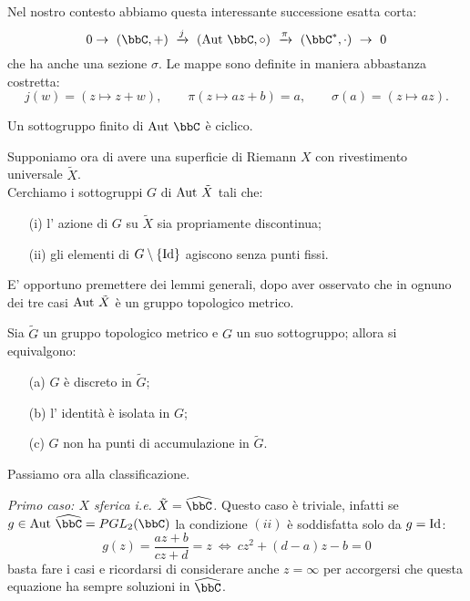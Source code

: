 Nel nostro contesto abbiamo questa interessante successione esatta corta:
$$
0\rightarrow\ (\bbC,+)\ \xrightarrow{j}\ (\Aut{\bbC},\circ)\ \xrightarrow{\pi}\ (\bbC^*,\cdot)\  \rightarrow\ 0
$$
che ha anche una sezione $\sigma$. Le mappe sono definite in maniera abbastanza costretta:
$$
j(w)=(z\mapsto z+w),\qquad \pi(z\mapsto az+b)=a,\qquad \sigma(a)=(z\mapsto az).
$$
\begin{esercizio}
Un sottogruppo finito di $\Aut{\bbC}$ è ciclico.
\end{esercizio}
Supponiamo ora di avere una superficie di Riemann $X$ con rivestimento universale $\tilde X$.\\
Cerchiamo i sottogruppi $G$ di $\text{Aut }{\tilde{X}}$ tali che:
\begin{itemize}
\item[(i)] l' azione di $G$ su $\tilde{X}$ sia propriamente discontinua;
\item[(ii)] gli elementi di $G\setminus\{\text{Id}\}$ agiscono senza punti fissi.
\end{itemize}
E' opportuno premettere dei lemmi generali, dopo aver osservato che in ognuno dei tre casi $\text{Aut }{\tilde{X}}$ è un gruppo topologico metrico.
\begin{lemma}Sia $\tilde G$ un gruppo topologico metrico e $G$ un suo sottogruppo; allora si equivalgono:
\begin{itemize}
\item[(a)] $G$ è discreto in $\tilde G$;
\item[(b)] l' identità è isolata in $G$;
\item[(c)] $G$ non ha punti di accumulazione in $\tilde G$.
\end{itemize}
\end{lemma}

Passiamo ora alla classificazione.

{\it Primo caso: $X$ sferica i.e. $\tilde {X}=\hat{\bbC}$.} Questo caso è triviale, infatti se $g\in\Aut{\hat{\bbC}}=PGL_2(\bbC)$ la condizione $(ii)$ è soddisfatta solo da $g=\text{Id}$:
$$
g(z)=\frac{az+b}{cz+d}=z\ \Leftrightarrow\ cz^2+(d-a)z-b=0
$$
basta fare i casi e ricordarsi di considerare anche $z=\infty$ per accorgersi che questa equazione ha sempre soluzioni in $\hat{\bbC}$.

